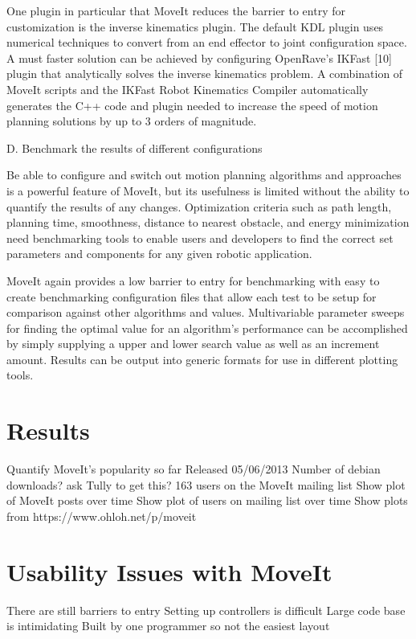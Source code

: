 \documentclass[10pt,journal,compsoc]{joser1}
\begin{document}
{One plugin in particular that MoveIt reduces the barrier to entry for customization is the inverse kinematics plugin. The default KDL plugin uses numerical techniques to convert from an end effector to joint configuration space. A must faster solution can be achieved by configuring OpenRave's IKFast [10] plugin that analytically solves the inverse kinematics problem. A combination of MoveIt scripts and the IKFast Robot Kinematics Compiler automatically generates the C++ code and plugin needed to increase the speed of motion planning solutions by up to 3 orders of magnitude.

D. Benchmark the results of different configurations

Be able to configure and switch out motion planning algorithms and approaches is a powerful feature of MoveIt, but its usefulness is limited without the ability to quantify the results of any changes. Optimization criteria such as path length, planning time, smoothness, distance to nearest obstacle, and energy minimization need benchmarking tools to enable users and developers to find the correct set parameters and components for any given robotic application.

MoveIt again provides a low barrier to entry for benchmarking with easy to create benchmarking configuration files that allow each test to be setup for comparison against other algorithms and values. Multivariable parameter sweeps for finding the optimal value for an algorithm's performance can be accomplished by simply supplying a upper and lower search value as well as an increment amount. Results can be output into generic formats for use in different plotting tools.

\section{Results}

Quantify MoveIt's popularity so far
Released 05/06/2013
Number of debian downloads? ask Tully to get this?
163 users on the MoveIt mailing list
Show plot of MoveIt posts over time
Show plot of users on mailing list over time
Show plots from https://www.ohloh.net/p/moveit

\section{Usability Issues with MoveIt}

There are still barriers to entry
Setting up controllers is difficult
Large code base is intimidating
Built by one programmer so not the easiest layout


}
\end{document}
